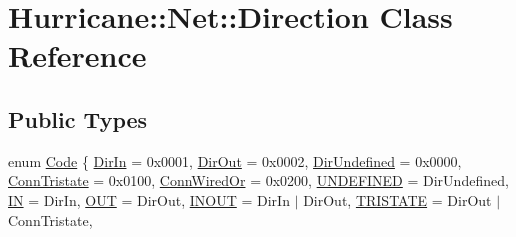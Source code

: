 \hypertarget{classHurricane_1_1Net_1_1Direction}{}\section{Hurricane\+:\+:Net\+:\+:Direction Class Reference}
\label{classHurricane_1_1Net_1_1Direction}
\subsection*{Public Types}
\begin{DoxyCompactItemize}
\item 
enum \hyperlink{classHurricane_1_1Net_1_1Direction_a5b34d7c3ac52628861af3a46f781fae4}{Code} \{ \newline
\hyperlink{classHurricane_1_1Net_1_1Direction_a5b34d7c3ac52628861af3a46f781fae4a36971421023586a2b5b019f468d699ba}{Dir\+In} = 0x0001, 
\newline
\hyperlink{classHurricane_1_1Net_1_1Direction_a5b34d7c3ac52628861af3a46f781fae4a1135f8c6a05d3801c43684bc195f66f0}{Dir\+Out} = 0x0002, 
\newline
\hyperlink{classHurricane_1_1Net_1_1Direction_a5b34d7c3ac52628861af3a46f781fae4a368b35a5f289879ad5c6862dfebc1b96}{Dir\+Undefined} = 0x0000, 
\newline
\hyperlink{classHurricane_1_1Net_1_1Direction_a5b34d7c3ac52628861af3a46f781fae4afa0b4523129378e11f6e9bdc72fba627}{Conn\+Tristate} = 0x0100, 
\newline
\hyperlink{classHurricane_1_1Net_1_1Direction_a5b34d7c3ac52628861af3a46f781fae4a03861307a54d5204f34c74365aa58f04}{Conn\+Wired\+Or} = 0x0200, 
\newline
\hyperlink{classHurricane_1_1Net_1_1Direction_a5b34d7c3ac52628861af3a46f781fae4ad15ab42a0127de740e1c2c05841c153a}{U\+N\+D\+E\+F\+I\+N\+ED} = Dir\+Undefined, 
\newline
\hyperlink{classHurricane_1_1Net_1_1Direction_a5b34d7c3ac52628861af3a46f781fae4aae6e926e7787f90824a4ee961e6ddac1}{IN} = Dir\+In, 
\newline
\hyperlink{classHurricane_1_1Net_1_1Direction_a5b34d7c3ac52628861af3a46f781fae4a2dac58452d767718df817bcf65906969}{O\+UT} = Dir\+Out, 
\newline
\hyperlink{classHurricane_1_1Net_1_1Direction_a5b34d7c3ac52628861af3a46f781fae4aa88aea57d992b95a08c24716b5265afd}{I\+N\+O\+UT} = Dir\+In $\vert$ Dir\+Out, 
\newline
\hyperlink{classHurricane_1_1Net_1_1Direction_a5b34d7c3ac52628861af3a46f781fae4a71a487a8129c354630d5e989d3994c98}{T\+R\+I\+S\+T\+A\+TE} = Dir\+Out $\vert$ Conn\+Tristate, 

\end{DoxyCompactItemize}
